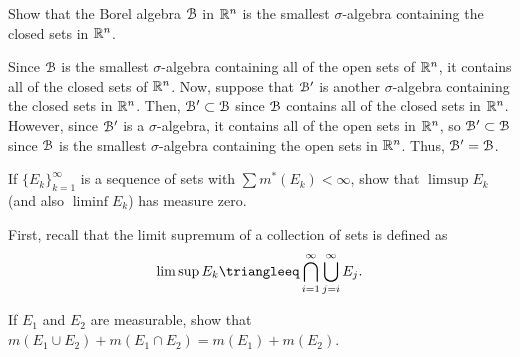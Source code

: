\begin{problem}
  Show that the Borel algebra $\mathcal{B}$ in $\mathbb{R}^n$ is the smallest
  $\sigma$-algebra containing the closed sets in $\mathbb{R}^n$.
\end{problem}
\begin{solution}
  Since $\mathcal{B}$ is the smallest $\sigma$-algebra containing all of the open
  sets of $\mathbb{R}^n$, it contains all of the closed sets of $\mathbb{R}^n$. Now,
  suppose that $\mathcal{B}'$ is another $\sigma$-algebra containing the closed
  sets in $\mathbb{R}^n$. Then, $\mathcal{B}'\subset\mathcal{B}$ since $\mathcal{B}$ contains all
  of the closed sets in $\mathbb{R}^n$. However, since $\mathcal{B}'$ is a
  $\sigma$-algebra, it contains all of the open sets in $\mathbb{R}^n$, so
  $\mathcal{B}'\subset\mathcal{B}$ since $\mathcal{B}$ is the smallest $\sigma$-algebra
  containing the open sets in $\mathbb{R}^n$. Thus, $\mathcal{B}'=\mathcal{B}$.
\end{solution}

\begin{problem}
  If ${\{E_k\}}_{k=1}^\infty$ is a sequence of sets with
  $\sum m^*(E_k)<\infty$, show that $\limsup E_k$ (and also $\liminf E_k$)
  has measure zero.
\end{problem}
\begin{solution}
  First, recall that the limit supremum of a collection of sets is defined
  as
  \[
    \limsup E_k\triangleeq \bigcap_{i=1}^\infty\bigcup_{j=i}^\infty E_j.
  \]
\end{solution}

\begin{problem}
  If $E_1$ and $E_2$ are measurable, show that
  $m(E_1\cup E_2)+m(E_1\cap E_2)=m(E_1)+m(E_2)$.
\end{problem}
\begin{solution}
\end{solution}

